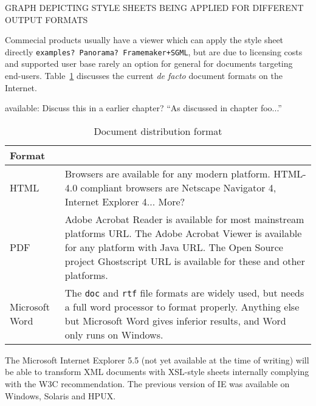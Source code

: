 \textsf{GRAPH DEPICTING STYLE SHEETS BEING APPLIED FOR DIFFERENT
  OUTPUT FORMATS}





Commecial products usually have a viewer which can apply the style
sheet directly \texttt{examples? Panorama? Framemaker+SGML}, but are
due to licensing costs and supported user base rarely an option for
general for documents targeting end-users.
Table~\ref{tab:distribution-formats} discusses the current \textit{de
  facto} document formats on the Internet.  


available: \textsf{Discuss this in a earlier chapter?  ``As discussed
  in chapter foo...''}

\begin{table}[htbp]
  \begin{center}
    \begin{tabular}{|l|p{10cm}|}
      \hline\hline
      Format & \\
      \hline

      HTML & Browsers are available for any modern platform.  HTML-4.0
      compliant browsers are Netscape Navigator 4, Internet Explorer
      4... \textsf{More?} \\ 
      
      PDF & Adobe Acrobat Reader is available for most
      mainstream platforms \textsf{URL}.  The Adobe Acrobat Viewer is
      available for any platform with Java \textsf{URL}.  The Open
      Source project Ghostscript \textsf{URL} is available for these
      and other platforms. \\
  
      
      Microsoft Word & The \texttt{doc} and \texttt{rtf} file formats
      are widely used, but needs a full word processor to format
      properly.  Anything else but Microsoft Word gives inferior
      results, and Word only runs on Windows.
      \\

      \hline
    \end{tabular}
    \caption{Document distribution format}
    \label{tab:distribution-formats}
  \end{center}
\end{table}


The Microsoft Internet Explorer 5.5 (not yet available at the time of
writing) will be able to transform XML documents with XSL-style sheets
internally complying with the W3C recommendation.  The previous
version of IE was available on Windows, Solaris and HPUX.

